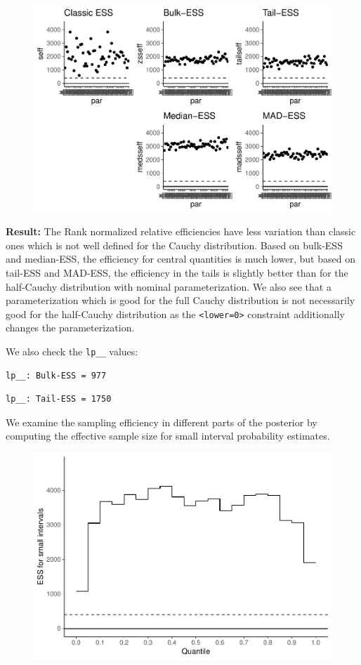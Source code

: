 \documentclass[american,]{article}
\begin{document}
\begin{figure}[tp]
  \centering
  \includegraphics[width=0.6\linewidth]{graphics/ess-fit-half-reparam-1.pdf}
\end{figure}

\textbf{Result:} The Rank normalized relative efficiencies have less
variation than classic ones which is not well defined for the Cauchy
distribution. Based on bulk-ESS and median-ESS, the efficiency for
central quantities is much lower, but based on tail-ESS and MAD-ESS, the
efficiency in the tails is slightly better than for the half-Cauchy
distribution with nominal parameterization. We also see that a
parameterization which is good for the full Cauchy distribution is not
necessarily good for the half-Cauchy distribution as the
\texttt{\textless{}lower=0\textgreater{}} constraint additionally
changes the parameterization.

We also check the \texttt{lp\_\_} values:

\begin{verbatim}
lp__: Bulk-ESS = 977
\end{verbatim}

\begin{verbatim}
lp__: Tail-ESS = 1750
\end{verbatim}

We examine the sampling efficiency in different parts of the posterior
by computing the effective sample size for small interval probability
estimates.

\begin{figure}[tp]
  \centering
  \includegraphics[width=0.6\linewidth]{graphics/local-ess-fit-half-reparam-1.pdf}
\end{figure}
\end{document}
